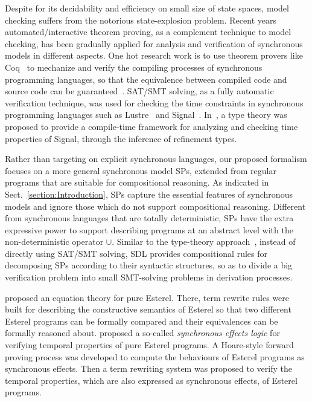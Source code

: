 \documentclass{fcs}
\begin{document}
Despite for its decidability and efficiency on small size of state spaces, model checking suffers from the notorious state-explosion problem.
Recent years automated/interactive theorem proving, as a complement technique to model checking, has been gradually applied for analysis and verification of synchronous models in different aspects.
One hot research work is to use theorem provers like Coq~\cite{Bertot04} to mechanize and verify the compiling processes of synchronous programming languages, so that
the equivalence between compiled code and source code can be guaranteed~\cite{Bourke17,Berry19}.
SAT/SMT solving, as a fully automatic verification technique, was used for checking the time constraints in synchronous programming languages such as Lustre~\cite{Hagen08} and Signal~\cite{Ngo14}.
In~\cite{Talpin15}, a type theory was proposed to provide a compile-time framework for analyzing and checking time properties of Signal, through the inference of refinement types.

Rather than targeting on explicit synchronous languages, our proposed formalism focuses on a more general synchronous model SPs, extended from regular programs that are suitable for compositional reasoning.
As indicated in Sect.~\ref{section:Introduction}, SPs capture the essential features of synchronous models and ignore those which do not support compositional reasoning.
Different from synchronous languages that are totally deterministic, SPs have the extra expressive power to support describing programs at an abstract level with the non-deterministic operator $\cup$.
Similar to the type-theory approach~\cite{Talpin15}, instead of directly using SAT/SMT solving, SDL provides compositional rules for decomposing SPs according to their syntactic structures, so as to divide a big verification problem into small SMT-solving problems in derivation processes.

\cite{Florence19} proposed an equation theory for pure Esterel.
There, term rewrite rules were built for describing the constructive semantics of Esterel so that two different Esterel programs can be formally compared and their equivalences can be formally reasoned about.
\cite{Song21} proposed a so-called \emph{synchronous effects logic} for verifying temporal properties of pure Esterel programs.
A Hoare-style forward proving process was developed to compute the behaviours of Esterel programs as synchronous effects.
Then a term rewriting system was proposed to verify the temporal properties, which are also expressed as synchronous effects, of Esterel programs.
\end{document}
